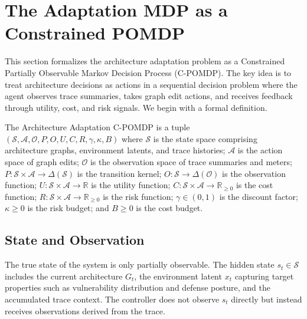 \documentclass[sigconf,anonymous]{acmart}
\newcommand{\R}{\mathbb{R}}
\begin{document}
\section{The Adaptation MDP as a Constrained POMDP}
\label{sec:adaptation}

This section formalizes the architecture adaptation problem as a Constrained Partially Observable Markov Decision Process (C-POMDP). The key idea is to treat architecture decisions as actions in a sequential decision problem where the agent observes trace summaries, takes graph edit actions, and receives feedback through utility, cost, and risk signals. We begin with a formal definition.

\begin{definition}
\label{def:cpomdp}
The Architecture Adaptation C-POMDP is a tuple $(\mathcal{S}, \mathcal{A}, \mathcal{O}, P, O, U, C, R, \gamma, \kappa, B)$ where $\mathcal{S}$ is the state space comprising architecture graphs, environment latents, and trace histories; $\mathcal{A}$ is the action space of graph edits; $\mathcal{O}$ is the observation space of trace summaries and meters; $P: \mathcal{S} \times \mathcal{A} \to \Delta(\mathcal{S})$ is the transition kernel; $O: \mathcal{S} \to \Delta(\mathcal{O})$ is the observation function; $U: \mathcal{S} \times \mathcal{A} \to \R$ is the utility function; $C: \mathcal{S} \times \mathcal{A} \to \R_{\ge 0}$ is the cost function; $R: \mathcal{S} \times \mathcal{A} \to \R_{\ge 0}$ is the risk function; $\gamma \in (0,1)$ is the discount factor; $\kappa \ge 0$ is the risk budget; and $B \ge 0$ is the cost budget.
\end{definition}

\subsection{State and Observation}

The true state of the system is only partially observable. The hidden state $s_t \in \mathcal{S}$ includes the current architecture $G_t$, the environment latent $x_t$ capturing target properties such as vulnerability distribution and defense posture, and the accumulated trace context. The controller does not observe $s_t$ directly but instead receives observations derived from the trace.
\end{document}

